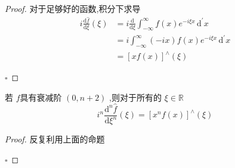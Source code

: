 \documentclass[../../PDE.tex]{subfiles}
\begin{document}
\begin{proof}
    对于足够好的函数,积分下求导 \[
    \begin{aligned}
    i \frac{\mathrm{d}\hat{f}}{\mathrm{d} \xi }\left(  \xi  \right)&= i \frac{\mathrm{d}}{\mathrm{d} \xi } \int_{-\infty}^{\infty} f\left( x \right) e^{-i \xi x}\,\mathrm{d} ^{\prime} x  \\ 
     &= i \int_{-\infty}^{\infty} \left( -ix \right) f\left( x \right)e^{-i \xi x}\,\mathrm{d} ^{\prime} x\\ 
      &= \left[ xf\left( x \right)  \right]^{\wedge }\left(  \xi  \right)    
    \end{aligned} 
    \]

    \hfill $\square$
\end{proof}
\begin{corollary}
    若 \(  f  \)具有衰减阶 \(  \left( 0,n+ 2 \right)   \)  ,则对于所有的 \(   \xi \in \mathbb{R}   \) \[
    i^{n}\frac{\mathrm{d}^{n } \hat{f}}{\mathrm{d} \xi ^{n}}\left(  \xi  \right)= \left[ x^{n}f\left( x \right)  \right]  ^{\wedge }\left(  \xi  \right) 
    \] 
\end{corollary}
\begin{proof}
    反复利用上面的命题

    \hfill $\square$
\end{proof}
\end{document}
